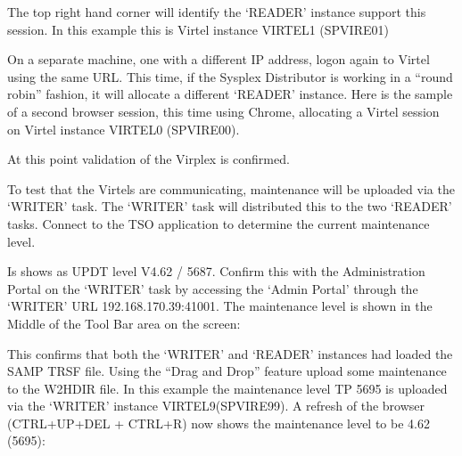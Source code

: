 \documentclass[letterpaper,10pt,english]{sphinxmanual}
\begin{document}
\sphinxAtStartPar
{}

\sphinxAtStartPar
The top right hand corner will identify the ‘READER’ instance support this session. In this example this is Virtel instance VIRTEL1 (SPVIRE01)

\sphinxAtStartPar
{}

\sphinxAtStartPar
On a separate machine, one with a different IP address, logon again to Virtel using the same URL. This time, if the Sysplex Distributor is working in a “round robin” fashion, it will allocate a different ‘READER’ instance. Here is the sample of a second browser session, this time using Chrome, allocating a Virtel session on Virtel instance VIRTEL0 (SPVIRE00).

\sphinxAtStartPar
{}

\sphinxAtStartPar
At this point validation of the Virplex is confirmed.

\ignorespaces 
\sphinxAtStartPar
{}

\sphinxAtStartPar
To test that the Virtels are communicating, maintenance will be uploaded via the ‘WRITER’ task. The ‘WRITER’ task will distributed this to the two ‘READER’ tasks. Connect to the TSO application to determine the current maintenance level.

\sphinxAtStartPar
{}

\sphinxAtStartPar
Is shows as UPDT level V4.62 / 5687. Confirm this with the Administration Portal on the ‘WRITER’ task by accessing the ‘Admin Portal’ through the ‘WRITER’ URL 192.168.170.39:41001. The maintenance level is shown in the Middle of the Tool Bar area on the screen:\sphinxhyphen{}

\sphinxAtStartPar
{}

\sphinxAtStartPar
This confirms that both the ‘WRITER’ and ‘READER’ instances had loaded the SAMP TRSF file. Using the “Drag and Drop” feature upload some maintenance to the W2H\sphinxhyphen{}DIR file. In this example the maintenance level TP 5695 is uploaded via the ‘WRITER’ instance VIRTEL9(SPVIRE99). A refresh of the browser (CTRL+UP+DEL + CTRL+R) now shows the maintenance level to be 4.62 (5695):\sphinxhyphen{}
\end{document}
